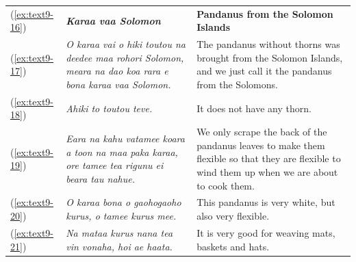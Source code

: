 \documentclass[output=paper]{langscibook}
\begin{document}
\begin{xltabular}{\textwidth}{lXX}
    (\ref{ex:text9-16})&\textit{\textbf{Karaa vaa Solomon}}&\textbf{Pandanus from the Solomon Islands}\\
    (\ref{ex:text9-17})&\textit{O karaa vai o hiki toutou na deedee maa rohori Solomon, meara na dao koa rara e bona karaa vaa Solomon.}&The pandanus without thorns was brought from the Solomon Islands, and we just call it the pandanus from the Solomons.\\
    (\ref{ex:text9-18})&\textit{Ahiki to toutou teve.}&It does not have any thorn.\\
    (\ref{ex:text9-19})&\textit{Eara na kahu vatamee koara a toon na maa paka karaa, ore tamee tea rigunu ei beara tau nahue.}&We only scrape the back of the pandanus leaves to make them flexible so that they are flexible to wind them up when we are about to cook them.\\
    (\ref{ex:text9-20})&\textit{O karaa bona o gaohogaoho kurus, o tamee kurus mee.}&This pandanus is very white, but also very flexible.\\
    (\ref{ex:text9-21})&\textit{Na mataa kurus nana tea vin vonaha, hoi ae haata.}&It is very good for weaving mats, baskets and hats.\\
\end{xltabular}
\end{document}
